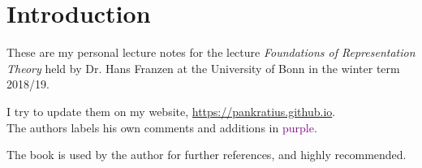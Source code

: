 \chapter*{Introduction}
These are my personal lecture notes for the lecture \textit{Foundations of Representation Theory} held by Dr. Hans Franzen at the University of Bonn in the winter term 2018/19.\par
I try to update them on my website, \url{https://pankratius.github.io}.\\
The authors labels his own comments and additions in \textcolor{purple}{purple}.\par
The book \cite{aluffi} is used by the author for further references, and highly recommended.
